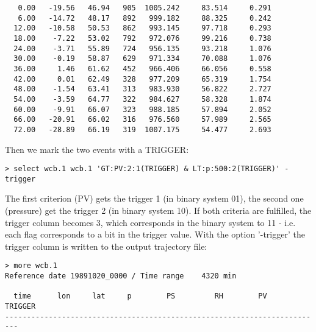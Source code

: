 \documentclass[a4paper,10pt]{article}
\begin{document}
\begin{itemize}
\begin{verbatim}
   0.00   -19.56   46.94   905  1005.242     83.514     0.291
   6.00   -14.72   48.17   892   999.182     88.325     0.242
  12.00   -10.58   50.53   862   993.145     97.718     0.293
  18.00    -7.22   53.02   792   972.076     99.216     0.738
  24.00    -3.71   55.89   724   956.135     93.218     1.076
  30.00    -0.19   58.87   629   971.334     70.088     1.076
  36.00     1.46   61.62   452   966.406     66.056     0.558
  42.00     0.01   62.49   328   977.209     65.319     1.754
  48.00    -1.54   63.41   313   983.930     56.822     2.727
  54.00    -3.59   64.77   322   984.627     58.328     1.874
  60.00    -9.91   66.07   323   988.185     57.894     2.052
  66.00   -20.91   66.02   316   976.560     57.989     2.565
  72.00   -28.89   66.19   319  1007.175     54.477     2.693
\end{verbatim}
Then we mark the two events with a TRIGGER:
\begin{verbatim}
> select wcb.1 wcb.1 'GT:PV:2:1(TRIGGER) & LT:p:500:2(TRIGGER)' -trigger
\end{verbatim}
The first criterion (PV) gets the trigger 1 (in binary system 01), the second one (pressure) get the trigger 2 (in binary system 10). If both criteria are fulfilled, the trigger column becomes 3, which corresponds in the binary system to 11 - i.e. each flag corresponds to a bit in the trigger value. With the option '-trigger' the trigger column is written to the output trajectory file:
\begin{verbatim}
> more wcb.1
Reference date 19891020_0000 / Time range    4320 min

  time      lon     lat     p        PS         RH        PV     TRIGGER
-------------------------------------------------------------------------


\end{verbatim}
\end{itemize}
\end{document}
